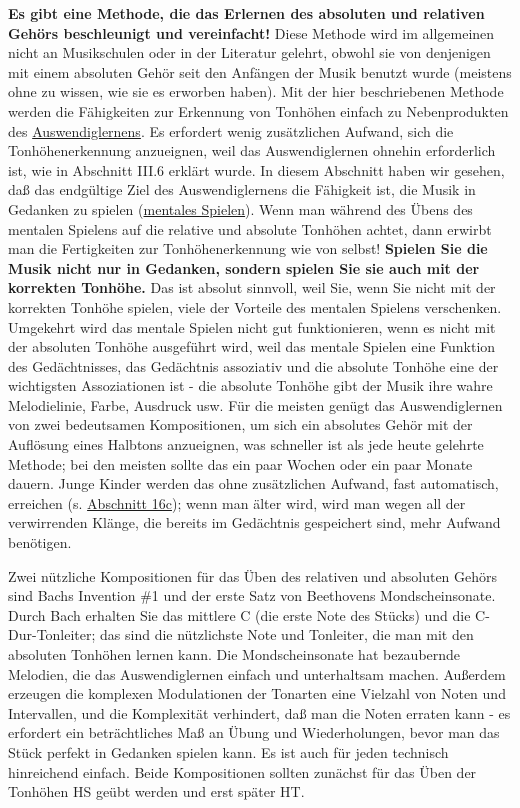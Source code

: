 \textbf{Es gibt eine Methode, die das Erlernen des absoluten und relativen Gehörs beschleunigt und vereinfacht!}
Diese Methode wird im allgemeinen nicht an Musikschulen oder in der Literatur gelehrt, obwohl sie von denjenigen mit einem absoluten Gehör seit den Anfängen der Musik benutzt wurde (meistens ohne zu wissen, wie sie es erworben haben).
Mit der hier beschriebenen Methode werden die Fähigkeiten zur Erkennung von Tonhöhen einfach zu Nebenprodukten des \hyperlink{c1iii6}{Auswendiglernens}.
Es erfordert wenig zusätzlichen Aufwand, sich die Tonhöhenerkennung anzueignen, weil das Auswendiglernen ohnehin erforderlich ist, wie in Abschnitt III.6 erklärt wurde.
In diesem Abschnitt haben wir gesehen, daß das endgültige Ziel des Auswendiglernens die Fähigkeit ist, die Musik in Gedanken zu spielen (\hyperlink{c1iii6tastatur}{mentales Spielen}).
Wenn man während des Übens des mentalen Spielens auf die relative und absolute Tonhöhen achtet, dann erwirbt man die Fertigkeiten zur Tonhöhenerkennung wie von selbst!
\textbf{Spielen Sie die Musik nicht nur in Gedanken, sondern spielen Sie sie auch mit der korrekten Tonhöhe.}
Das ist absolut sinnvoll, weil Sie, wenn Sie nicht mit der korrekten Tonhöhe spielen, viele der Vorteile des mentalen Spielens verschenken.
Umgekehrt wird das mentale Spielen nicht gut funktionieren, wenn es nicht mit der absoluten Tonhöhe ausgeführt wird, weil das mentale Spielen eine Funktion des Gedächtnisses, das Gedächtnis assoziativ und die absolute Tonhöhe eine der wichtigsten Assoziationen ist - die absolute Tonhöhe gibt der Musik ihre wahre Melodielinie, Farbe, Ausdruck usw.
Für die meisten genügt das Auswendiglernen von zwei bedeutsamen Kompositionen, um sich ein absolutes Gehör mit der Auflösung eines Halbtons anzueignen, was schneller ist als jede heute gelehrte Methode; bei den meisten sollte das ein paar Wochen oder ein paar Monate dauern.
Junge Kinder werden das ohne zusätzlichen Aufwand, fast automatisch, erreichen (s. \hyperlink{c1iii16c}{Abschnitt 16c}); wenn man älter wird, wird man wegen all der verwirrenden Klänge, die bereits im Gedächtnis gespeichert sind, mehr Aufwand benötigen.

Zwei nützliche Kompositionen für das Üben des relativen und absoluten Gehörs sind Bachs Invention \#1 und der erste Satz von Beethovens Mondscheinsonate.
Durch Bach erhalten Sie das mittlere C (die erste Note des Stücks) und die C-Dur-Tonleiter; das sind die nützlichste Note und Tonleiter, die man mit den absoluten Tonhöhen lernen kann.
Die Mondscheinsonate hat bezaubernde Melodien, die das Auswendiglernen einfach und unterhaltsam machen.
Außerdem erzeugen die komplexen Modulationen der Tonarten eine Vielzahl von Noten und Intervallen, und die Komplexität verhindert, daß man die Noten erraten kann - es erfordert ein beträchtliches Maß an Übung und Wiederholungen, bevor man das Stück perfekt in Gedanken spielen kann.
Es ist auch für jeden technisch hinreichend einfach.
Beide Kompositionen sollten zunächst für das Üben der Tonhöhen HS geübt werden und erst später HT.

